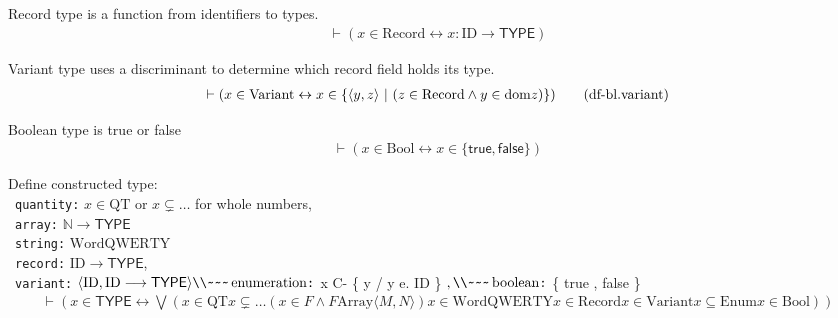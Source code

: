 \begin{metadefinition} Record type is a function from identifiers to types.
\begin{align}
\vdash ( x \in \mathrm{Record} \leftrightarrow x : \mathrm{ID} \longrightarrow \mathsf{TYPE} )\label{eq:df-bl.record}\tag{df-bl.record}
\end{align}
\end{metadefinition}


\begin{metadefinition} Variant type uses a discriminant to determine which record field holds its type.
\begin{align}
\vdash ( x \in \mathrm{Variant} \leftrightarrow x \in \{ \langle y , z \rangle ~\vert~ ( z \in \mathrm{Record} \wedge y \in {\rm dom} z ) \} )\label{eq:df-bl.variant}\tag{df-bl.variant}
\end{align}
\end{metadefinition}


\begin{metadefinition} Boolean type is true or false
\begin{align}
\vdash ( x \in \mathrm{Bool} \leftrightarrow x \in \{ \mathsf{true} , \mathsf{false} \} )\label{eq:df-bl.bool}\tag{df-bl.bool}
\end{align}
\end{metadefinition}


\begin{metadefinition} Define constructed type: \\~{\tt quantity:} $x \in \mathrm{QT}$ or $x \subsetneq \ldots$ for whole numbers, \\~{\tt array:} $\mathbb{N} \longrightarrow
\mathsf{TYPE}$ \\~{\tt string:} $\mathrm{Word } \mathrm{QWERTY}$ \\~{\tt record:} $\mathrm{ID} \longrightarrow \mathsf{TYPE}$, \\~{\tt variant:} $\langle \mathrm{ID} , \mathrm{ID} \longrightarrow
\mathsf{TYPE} \rangle \mbox{\rm {\tt \char`\\}{\tt \char`\\}{\tt \char`\~}{\tt \char`\~}{\tt \char`\~}} \,\mbox{\rm enumeration{\tt :}}$ x C- \{ y / y e. ID \} $, \mbox{\rm {\tt \char`\\}{\tt
\char`\\}{\tt \char`\~}{\tt \char`\~}{\tt \char`\~}} \,\mbox{\rm boolean{\tt :}}$ \{ true , false \} $$
\begin{align}
\vdash ( x \in \mathsf{TYPE} \leftrightarrow \bigvee( x \in \mathrm{QT} x \subsetneq \ldots ( x \in F \wedge F \mathrm{Array} \langle M , N \rangle ) x \in \mathrm{Word } \mathrm{QWERTY} x \in
    \mathrm{Record} x \in \mathrm{Variant} x \subseteq \mathrm{Enum} x \in \mathrm{Bool} ) )\label{eq:df-bl.type}\tag{df-bl.type}
\end{align}
\end{metadefinition}


